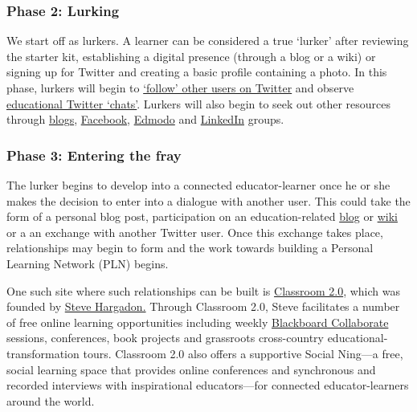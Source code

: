 \subsubsection{Phase 2: Lurking}\label{phase-2-lurking}

We start off as lurkers. A learner can be considered a true `lurker'
after reviewing the starter kit, establishing a digital presence
(through a blog or a wiki) or signing up for Twitter and creating a
basic profile containing a photo. In this phase, lurkers will begin to
\href{http://www.google.com/url?q=http\%3A\%2F\%2Fwww.fractuslearning.com\%2F2012\%2F05\%2F25\%2Ftwitter-follow-education-technology\%2F\&sa=D\&sntz=1\&usg=AFQjCNF8grPMuRwU_ImW9Jk3ZYrg0m9KgQ}{`follow'
other users on Twitter} and observe
\href{http://www.google.com/url?q=http\%3A\%2F\%2Fcybraryman.com\%2Fchats.html\&sa=D\&sntz=1\&usg=AFQjCNFJASZiwfvPbfOzFbHvAunpXfNC1g}{educational
Twitter `chats'}. Lurkers will also begin to seek out other resources
through
\href{http://theinnovativeeducator.blogspot.ca/2012/04/ten-best-education-blogs.html}{blogs},
\href{http://www.google.com/url?q=http\%3A\%2F\%2Fwww.edsocialmedia.com\%2F2011\%2F02\%2Fthe-advantage-of-facebook-groups-in-education\%2F\&sa=D\&sntz=1\&usg=AFQjCNEvc43Q7GqJqS-2S8GhEJ53Ye-j4Q}{Facebook},
\href{http://www.slideshare.net/cmsdsquires/edmodo-for-teachers-guide}{Edmodo}
and
\href{http://www.emergingedtech.com/2012/02/8-great-linkedin-groups-for-educators/}{LinkedIn}
groups.

\subsubsection{Phase 3: Entering the
fray}\label{phase-3-entering-the-fray}

The lurker begins to develop into a connected educator-learner once he
or she makes the decision to enter into a dialogue with another user.
This could take the form of a personal blog post, participation on an
education-related
\href{http://edudemic.com/2012/08/education-blogs/?utm_medium=twitter\&utm_source=twitterfeed}{blog}
or
\href{http://educationalwikis.wikispaces.com/Examples+of+educational+wikis}{wiki}
or a an exchange with another Twitter user. Once this exchange takes
place, relationships may begin to form and the work towards building a
Personal Learning Network (PLN) begins.

One such site where such relationships can be built is
\href{http://www.classroom20.com/}{Classroom 2.0}, which was founded by
\href{http://www.stevehargadon.com/}{Steve Hargadon.} Through Classroom
2.0, Steve facilitates a number of free online learning opportunities
including weekly
\href{http://www.google.com/url?q=http\%3A\%2F\%2Fwww.futureofeducation.com\%2Fnotes\%2FPast_Interviews\&sa=D\&sntz=1\&usg=AFQjCNHVYOvP-w7NTgKp2Fu2AX4YycnPQQ}{Blackboard
Collaborate} sessions, conferences, book projects and grassroots
cross-country educational-transformation tours. Classroom 2.0 also
offers a supportive Social Ning---a free, social learning space that
provides online conferences and synchronous and recorded interviews with
inspirational educators---for connected educator-learners around the
world.


